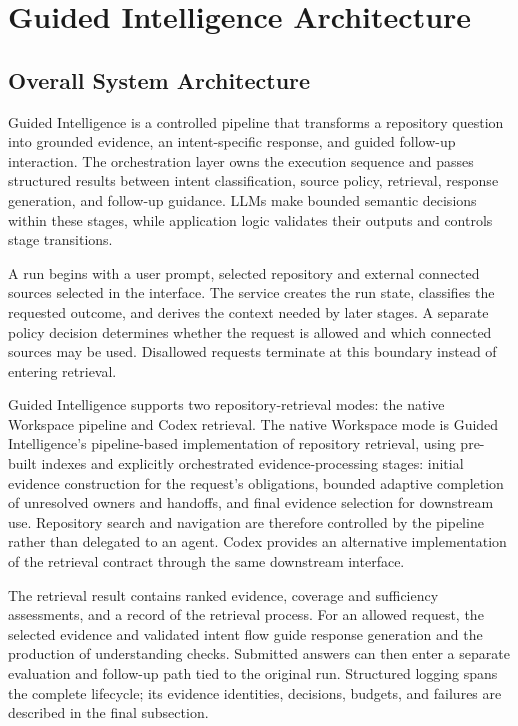 \chapter{Guided Intelligence Architecture}\label{ch:guided-intelligence-architecture}

\section{Overall System Architecture}\label{sec:overall-system-architecture}

Guided Intelligence is a controlled pipeline that transforms a repository question into grounded evidence, an intent-specific response, and guided follow-up interaction. The orchestration layer owns the execution sequence and passes structured results between intent classification, source policy, retrieval, response generation, and follow-up guidance. LLMs make bounded semantic decisions within these stages, while application logic validates their outputs and controls stage transitions.

A run begins with a user prompt, selected repository and external connected sources selected in the interface. The service creates the run state, classifies the requested outcome, and derives the context needed by later stages. A separate policy decision determines whether the request is allowed and which connected sources may be used. Disallowed requests terminate at this boundary instead of entering retrieval.

Guided Intelligence supports two repository-retrieval modes: the native Workspace pipeline and Codex retrieval. The native Workspace mode is Guided Intelligence's pipeline-based implementation of repository retrieval, using pre-built indexes and explicitly orchestrated evidence-processing stages: initial evidence construction for the request's obligations, bounded adaptive completion of unresolved owners and handoffs, and final evidence selection for downstream use. Repository search and navigation are therefore controlled by the pipeline rather than delegated to an agent. Codex provides an alternative implementation of the retrieval contract through the same downstream interface.

The retrieval result contains ranked evidence, coverage and sufficiency assessments, and a record of the retrieval process. For an allowed request, the selected evidence and validated intent flow guide response generation and the production of understanding checks. Submitted answers can then enter a separate evaluation and follow-up path tied to the original run. Structured logging spans the complete lifecycle; its evidence identities, decisions, budgets, and failures are described in the final subsection.

